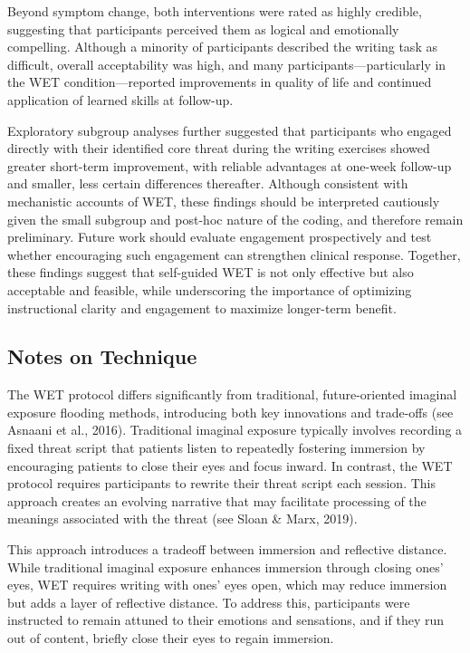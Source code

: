 \documentclass[
  man,floatsintext]{apa7}
\begin{document}
Beyond symptom change, both interventions were rated as highly credible, suggesting that participants perceived them as logical and emotionally compelling.
Although a minority of participants described the writing task as difficult, overall acceptability was high, and many participants---particularly in the WET condition---reported improvements in quality of life and continued application of learned skills at follow-up.

Exploratory subgroup analyses further suggested that participants who engaged directly with their identified core threat during the writing exercises showed greater short-term improvement, with reliable advantages at one-week follow-up and smaller, less certain differences thereafter.
Although consistent with mechanistic accounts of WET, these findings should be interpreted cautiously given the small subgroup and post-hoc nature of the coding, and therefore remain preliminary.
Future work should evaluate engagement prospectively and test whether encouraging such engagement can strengthen clinical response.
Together, these findings suggest that self-guided WET is not only effective but also acceptable and feasible, while underscoring the importance of optimizing instructional clarity and engagement to maximize longer-term benefit.

\subsection{Notes on Technique}\label{notes-on-technique}

The WET protocol differs significantly from traditional, future-oriented imaginal exposure flooding methods, introducing both key innovations and trade-offs (see Asnaani et al., 2016).
Traditional imaginal exposure typically involves recording a fixed threat script that patients listen to repeatedly fostering immersion by encouraging patients to close their eyes and focus inward.
In contrast, the WET protocol requires participants to rewrite their threat script each session.
This approach creates an evolving narrative that may facilitate processing of the meanings associated with the threat (see Sloan \& Marx, 2019).

This approach introduces a tradeoff between immersion and reflective distance.
While traditional imaginal exposure enhances immersion through closing ones' eyes, WET requires writing with ones' eyes open, which may reduce immersion but adds a layer of reflective distance.
To address this, participants were instructed to remain attuned to their emotions and sensations, and if they run out of content, briefly close their eyes to regain immersion.
\end{document}
